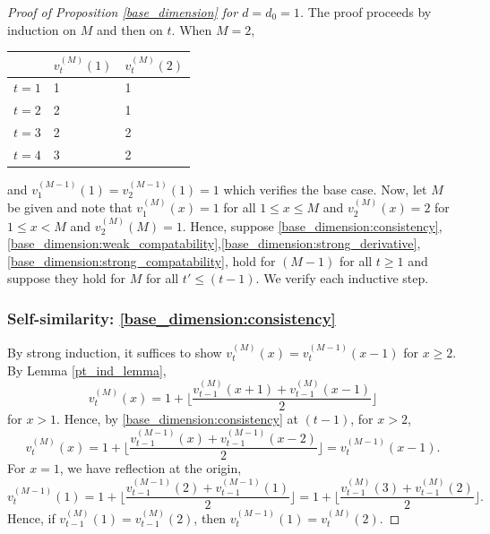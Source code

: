 \documentclass[12pt]{amsart}
\begin{document}
	\begin{proof}[Proof of Proposition \ref{base_dimension} for $d=d_0 = 1$]
		The proof proceeds by induction on $M$ and then on $t$. When $M=2$, 
		\begin{center}
			\begin{tabular}{l|l|l}
				& $v_t^{(M)}(1)$ & $v_t^{(M)}(2)$ \\ \hline
				$t=1$ & 1 & 1  \\ 
				$t=2$ & 2 & 1  \\ 
				$t=3$ & 2 & 2 \\
				$t=4$ & 3 & 2 
			\end{tabular}
		\end{center}
		and $v_1^{(M-1)}(1) = v_2^{(M-1)}(1) = 1$ which verifies the base case. Now, let $M$ be given and note that
		$v_1^{(M)}(x) = 1$ for all $1 \leq x \leq M$ and $v_2^{(M)}(x) = 2$ for $1 \leq x < M$
		and $v_2^{(M)}(M) = 1$. Hence, suppose \eqref{base_dimension:consistency},\eqref{base_dimension:weak_compatability},\eqref{base_dimension:strong_derivative},\eqref{base_dimension:strong_compatability}, hold for $(M-1)$ for all $t \geq 1$ 
		and suppose they hold for $M$ for all $t' \leq (t-1)$. 
		We verify each inductive step. 
		
		\subsubsection*{Self-similarity: \eqref{base_dimension:consistency}} \label{subsubsec:one_dim_self_similarity}
		By strong induction, it suffices to show $v_t^{(M)}(x) = v_t^{(M-1)}(x-1)$ for $x \geq 2$.
		By Lemma \ref{pt_ind_lemma}, 
		\[
		v_{t}^{(M)}(x) = 1 + \lfloor \frac{v_{t-1}^{(M)}(x+1) + v_{t-1}^{(M)}(x-1)}{2} \rfloor
		\]
		for $x > 1$. 
		Hence, by \eqref{base_dimension:consistency} at $(t-1)$, for $x > 2$, 
		\[
		v_{t}^{(M)}(x) = 1 + \lfloor \frac{v_{t-1}^{(M-1)}(x) + v_{t-1}^{(M-1)}(x-2)}{2} \rfloor = v_t^{(M-1)}(x-1).
		\]
		For $x=1$, we have reflection at the origin, 
		\[
		v_{t}^{(M-1)}(1) = 1 + \lfloor \frac{v_{t-1}^{(M-1)}(2) + v_{t-1}^{(M-1)}(1)}{2} \rfloor = 1 + \lfloor \frac{v_{t-1}^{(M)}(3) + v_{t-1}^{(M)}(2)}{2} \rfloor.
		\]
		Hence, if $v_{t-1}^{(M)}(1) = v_{t-1}^{(M)}(2)$, then $v_{t}^{(M-1)}(1) = v_{t}^{(M)}(2)$. 
		

\end{proof}
\end{document}
